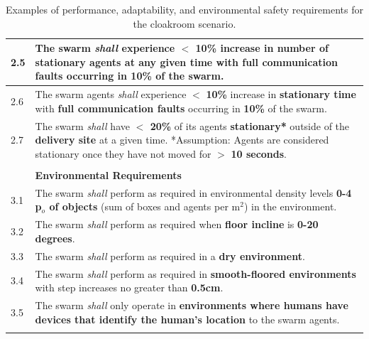 \documentclass[runningheads]{llncs}
\begin{document}
\begin{table}[!b]
\begin{tabular}{p{5mm} p{116mm} }
		\hline
		2.5 & The swarm \emph{shall} experience $<$ \textbf{10\%} increase in \textbf{number of stationary agents} at any given time with \textbf{full communication faults} occurring in \textbf{10\%} of the swarm.\\
		\hline
		2.6 & The swarm agents \emph{shall} experience $<$ \textbf{10\%} increase in \textbf{stationary time} with \textbf{full communication faults} occurring in \textbf{10\%} of the swarm. \\	
		\hline
		2.7 & The swarm \emph{shall} have \textbf{$<$ 20\%} of its agents \textbf{stationary*} outside of the \textbf{delivery site} at a given time.
		*Assumption: Agents are considered stationary once they have not moved for $>$ \textbf{10 seconds}. \\ 
        \hline \\[-1.25\medskipamount]
	    & \textbf{Environmental Requirements} \\ 
		\hline
		3.1 & The swarm \emph{shall} perform as required in environmental density levels \textbf{0-4 p$_o$ of objects} (sum of boxes and agents per m$^2$) in the environment. %
		\\ 
		\hline
		3.2 & The swarm \emph{shall} perform as required when \textbf{floor incline} is \textbf{0-20 degrees}.
		\\ 
		\hline
		3.3 & The swarm \emph{shall} perform as required in a \textbf{dry environment}.
		\\ 
		\hline
		3.4 & The swarm \emph{shall} perform as required in \textbf{smooth-floored environments} with step increases no greater than \textbf{0.5cm}.
		\\ 
		\hline
		3.5 & The swarm \emph{shall} only operate in \textbf{environments where humans have devices that identify the human’s location} to the swarm agents. 
		\\ 		
		\hline \\[-1\medskipamount]
	\end{tabular}
	\caption{\label{tab:reqs}Examples of performance, adaptability, and environmental safety requirements for the cloakroom scenario.}
	\vspace{-4ex}
\end{table}

\end{document}
